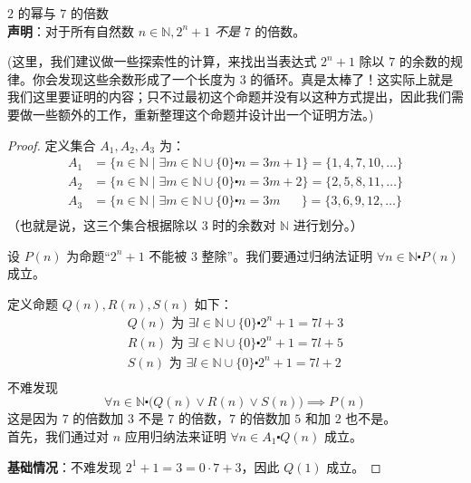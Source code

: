 \begin{example}{$2$ 的幂与 $7$ 的倍数}\\
    \textbf{声明}：对于所有自然数 $n \in \mathbb{N}, 2^n+1$ \emph{不是} $7$ 的倍数。
\end{example}

(这里，我们建议做一些探索性的计算，来找出当表达式 $2^n + 1$ 除以 $7$ 的余数的规律。你会发现这些余数形成了一个长度为 $3$ 的循环。真是太棒了！这实际上就是我们这里要证明的内容；只不过最初这个命题并没有以这种方式提出，因此我们需要做一些额外的工作，重新整理这个命题并设计出一个证明方法。)

\begin{proof}
    定义集合 $A_1, A_2, A_3$ 为：
    \begin{align*}
        A_1 &= \{n \in \mathbb{N} \mid \exists m \in \mathbb{N} \cup \{0\} \centerdot n = 3m + 1\} = \{1, 4, 7, 10, \dots \} \\
        A_2 &= \{n \in \mathbb{N} \mid \exists m \in \mathbb{N} \cup \{0\} \centerdot n = 3m + 2\} = \{2, 5, 8, 11, \dots \} \\
        A_3 &= \{n \in \mathbb{N} \mid \exists m \in \mathbb{N} \cup \{0\} \centerdot n = 3m \quad\:\:\:\} = \{3, 6, 9, 12, \dots \} \\
    \end{align*}
    （也就是说，这三个集合根据除以 $3$ 时的余数对 $\mathbb{N}$ 进行划分。）

    设 $P(n)$ 为命题``$2^n+1$ 不能被 $3$ 整除''。我们要通过归纳法证明 $\forall n \in \mathbb{N} \centerdot P(n)$ 成立。

    定义命题 $Q(n), R(n), S(n)$ 如下：
    \begin{align*}
        Q(n) \text{ 为 } \exists l \in \mathbb{N} \cup \{0\} \centerdot 2^n + 1 = 7l + 3 \\
        R(n) \text{ 为 } \exists l \in \mathbb{N} \cup \{0\} \centerdot 2^n + 1 = 7l + 5 \\
        S(n) \text{ 为 } \exists l \in \mathbb{N} \cup \{0\} \centerdot 2^n + 1 = 7l + 2 \\
    \end{align*}
    不难发现
    \[\forall n \in \mathbb{N} \centerdot \big(Q(n) \lor R(n) \lor S(n)\big) \implies P(n)\]
    这是因为 $7$ 的倍数加 $3$ 不是 $7$ 的倍数，$7$ 的倍数加 $5$ 和加 $2$ 也不是。\\
    
    首先，我们通过对 $n$ 应用归纳法来证明 $\forall n \in A_1 \centerdot Q(n)$ 成立。

    \textbf{基础情况}：不难发现 $2^1+1=3 = 0 \cdot 7 + 3$，因此 $Q(1)$ 成立。


\end{proof}
